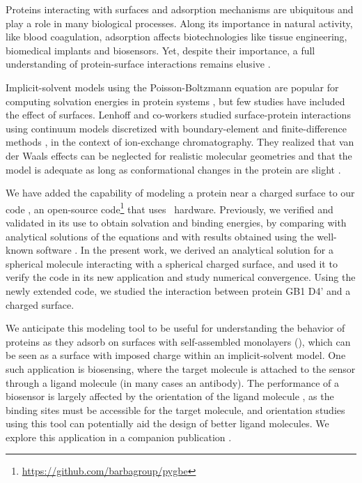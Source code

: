 
Proteins interacting with surfaces and adsorption mechanisms are ubiquitous and play a role in many biological processes. 
Along its importance in natural activity, like blood coagulation, adsorption affects biotechnologies like tissue engineering, biomedical implants and biosensors.
Yet, despite their importance, a full understanding of protein-surface interactions remains elusive \cite{Gray2004,RabeVerdesSeegel2011}.

Implicit-solvent models using the Poisson-Boltzmann equation are popular for computing solvation energies in protein systems \cite{RouxSimonson1999,Bardhan2012}, but few studies have included the effect of surfaces. Lenhoff and co-workers studied surface-protein interactions using continuum models discretized with boundary-element \cite{YoonLenhoff1992,RothLenhoff1993,AsthagiriLenhoff1997} and finite-difference methods \cite{YaoLenhoff2004,YaoLenhoff2005}, in the context of ion-exchange chromatography. They realized that van der Waals effects can be neglected for realistic molecular geometries \cite{RothNealLenhoff1996} and that the model is adequate as long as conformational changes in the protein are slight \cite{YaoLenhoff2004,YaoLenhoff2005}. 

We have added the capability of modeling a protein near a charged surface to our code \pygbe, an open-source code\footnote{\url{https://github.com/barbagroup/pygbe}}  that uses \gpu\ hardware.  Previously, we verified and validated \pygbe in its use to obtain solvation and binding energies, by comparing with analytical solutions of the equations and with results obtained using the well-known \apbs software \cite{CooperBarba-share154331,CooperBardhanBarba2013}. 
In the present work, we derived an analytical solution for a spherical molecule interacting with a spherical charged surface, and used it to verify the code in its new application and study numerical convergence.
Using the newly extended code, we studied the interaction between protein GB1 D4' and a charged surface.

We anticipate this modeling tool to be useful for understanding the behavior of proteins as they adsorb on surfaces with self-assembled monolayers (\sam), which can be seen as a surface with imposed charge within an implicit-solvent model. 
One such application is biosensing, where the target molecule is attached to the sensor through a ligand molecule (in many cases an antibody). The performance of a biosensor is largely affected by the orientation of the ligand molecule \cite{TajimaTakaiIshihara2011,TrillingBeekwilderZuilhof2013}, as the binding sites must be accessible for the target molecule, and orientation studies using this tool can potentially aid the design of better ligand molecules. We explore this application in a companion publication \cite{CooperBarba2015b}.
